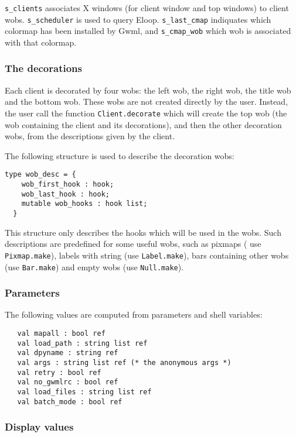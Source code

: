 \documentclass{book}
\begin{document}
  {\tt s\_clients} associates X windows (for client window and top 
windows) to client wobs. {\tt s\_scheduler} is used to query Eloop.
{\tt s\_last\_cmap} indiquates which colormap has been installed by Gwml, 
and {\tt s\_cmap\_wob} which wob is associated with that colormap.

\subsubsection{The decorations}

  Each client is decorated by four wobs: the left wob, the right wob, the 
title wob and the bottom wob. These wobs are not created directly by the 
user. Instead, the user call the function {\tt Client.decorate} which will create
the top wob (the wob containing the client and its decorations), and then the
other decoration wobs, from the descriptions given by the client.

The following structure is used to describe the decoration wobs:
\begin{verbatim}
type wob_desc = {
    wob_first_hook : hook;
    wob_last_hook : hook;
    mutable wob_hooks : hook list;
  }
\end{verbatim}

This structure only describes the hooks which will be used in the wobs.
Such descriptions are predefined for some useful wobs, such as pixmaps (
use {\tt Pixmap.make}), labels with string (use {\tt Label.make}), bars 
containing other wobs (use {\tt Bar.make}) and empty wobs (use {\tt Null.make}).

\subsubsection{Parameters}

The following values are computed from parameters and shell variables:

\begin{verbatim}
   val mapall : bool ref
   val load_path : string list ref
   val dpyname : string ref
   val args : string list ref (* the anonymous args *)
   val retry : bool ref
   val no_gwmlrc : bool ref
   val load_files : string list ref
   val batch_mode : bool ref
\end{verbatim}

\subsubsection{Display values}
\end{document}

